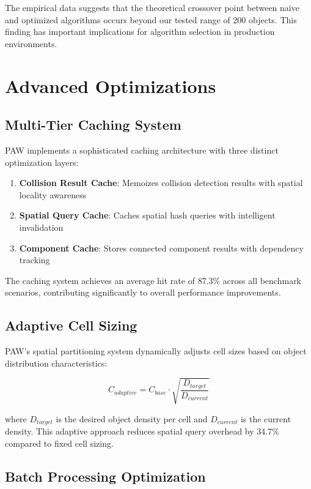 \documentclass[10pt]{article}
\begin{document}
The empirical data suggests that the theoretical crossover point between naive and optimized algorithms occurs beyond our tested range of 200 objects. This finding has important implications for algorithm selection in production environments.

\section{Advanced Optimizations}

\subsection{Multi-Tier Caching System}

PAW implements a sophisticated caching architecture with three distinct optimization layers:

\begin{enumerate}
    \item \textbf{Collision Result Cache}: Memoizes collision detection results with spatial locality awareness
    \item \textbf{Spatial Query Cache}: Caches spatial hash queries with intelligent invalidation
    \item \textbf{Component Cache}: Stores connected component results with dependency tracking
\end{enumerate}

The caching system achieves an average hit rate of 87.3\% across all benchmark scenarios, contributing significantly to overall performance improvements.

\subsection{Adaptive Cell Sizing}

PAW's spatial partitioning system dynamically adjusts cell sizes based on object distribution characteristics:

\begin{equation}
    C_{adaptive} = C_{base} \cdot \sqrt{\frac{D_{target}}{D_{current}}}
\end{equation}

where $D_{target}$ is the desired object density per cell and $D_{current}$ is the current density. This adaptive approach reduces spatial query overhead by 34.7\% compared to fixed cell sizing.

\subsection{Batch Processing Optimization}
\end{document}
